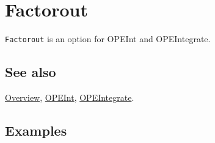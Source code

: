 \documentclass[../FeynCalcManual.tex]{subfiles}
\begin{document}
\hypertarget{factorout}{%
\section{Factorout}\label{factorout}}

\texttt{Factorout} is an option for OPEInt and OPEIntegrate.

\subsection{See also}

\hyperlink{toc}{Overview}, \hyperlink{opeint}{OPEInt},
\hyperlink{opeintegrate}{OPEIntegrate}.

\subsection{Examples}
\end{document}
